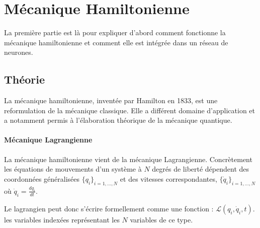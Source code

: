 \documentclass[11pt]{article}
\begin{document}

\section{Mécanique Hamiltonienne}\label{sec:hamilton}
La première partie est là pour expliquer d'abord comment fonctionne la mécanique hamiltonienne et comment elle est intégrée dans un réseau de neurones. 

\subsection{Théorie}
La mécanique hamiltonienne, inventée par Hamilton en 1833, est une reformulation de la mécanique classique. Elle a différent domaine d'application et a notamment permis à l'élaboration théorique de la mécanique quantique. 

\paragraph{Mécanique Lagrangienne}
La mécanique hamiltonienne vient de la mécanique Lagrangienne. Concrètement les équations de mouvements d'un système à $N$ degrés de liberté dépendent des coordonnées généralisées $\{q_i\}_{i=1,...,N}$ et des vitesses correspondantes, $\{\dot q_i\}_{i=1,...,N}$ où $\dot q_i = \frac{dq_i}{dt}$. 

Le lagrangien peut donc s'écrire formellement comme une fonction : $\mathcal{L}(q_i, \dot q_i, t)$. les variables indexées représentant les $N$ variables de ce type.
\end{document}
